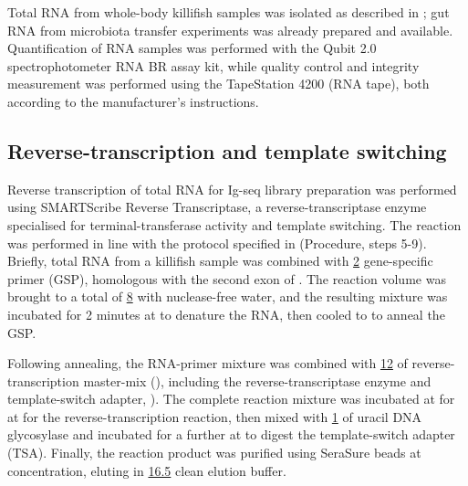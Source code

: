 Total RNA from whole-body killifish samples was isolated as described in ; gut RNA from microbiota transfer experiments \parencite{smith2017microbiota} was already prepared and available. Quantification of RNA samples was performed with the Qubit 2.0 spectrophotometer RNA BR assay kit, while quality control and integrity measurement was performed using the TapeStation 4200 (RNA tape), both according to the manufacturer's instructions.

\subsection{Reverse-transcription and template switching}
\label{sec:methods_molec_igseq_rt}

Reverse transcription of total RNA for Ig-seq library preparation was performed using SMARTScribe Reverse Transcriptase, a reverse-transcriptase enzyme specialised for terminal-transferase activity and template switching. %
The reaction was performed in line with the protocol specified in \parencite{turchaninova2016igprep} (Procedure, steps 5-9). Briefly,  total RNA from a killifish sample was combined with \ul{2}  gene-specific primer (GSP), homologous with the second \ch exon of \Nfu {}. %
The reaction volume was brought to a total of \ul{8} with nuclease-free water, and the resulting mixture was incubated for 2 minutes at  to denature the RNA, then cooled to  to anneal the GSP. 

Following annealing, the RNA-primer mixture was combined with \ul{12} of reverse-transcription master-mix (), including the reverse-transcriptase enzyme and template-switch adapter, ). %
The complete reaction mixture was incubated at for  at  for the reverse-transcription reaction, then mixed with \ul{1} of uracil DNA glycosylase and incubated for a further  at  to digest the template-switch adapter (TSA). Finally, the reaction product was purified using SeraSure beads at  concentration, eluting in \ul{16.5} clean elution buffer. %


